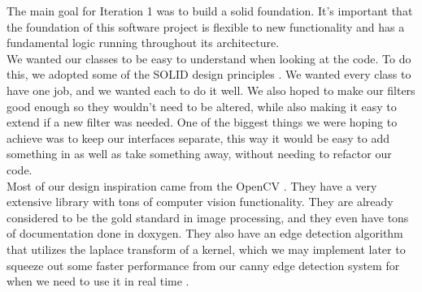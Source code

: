 The main goal for Iteration 1 was to build a solid foundation. It’s important that the foundation 
of this software project is flexible to new functionality and has a fundamental logic running 
throughout its architecture. \\

We wanted our classes to be easy to understand when looking at the code.  To do this, we adopted 
some of the SOLID design principles \cite{solid}.  We wanted every class to have one job, and we 
wanted each to do it well.  We also hoped to make our filters good enough so they wouldn’t need 
to be altered, while also making it easy to extend if a new filter was needed.  One of the 
biggest things we were hoping to achieve was to keep our interfaces separate, this way it would 
be easy to add something in as well as take something away, without needing to refactor our code. \\

Most of our design inspiration came from the OpenCV \cite{geek}.  They have a very extensive library 
with tons of computer vision functionality.  They are already considered to be the gold standard in 
image processing, and they even have tons of documentation done in doxygen.  They also have an 
edge detection algorithm that utilizes the laplace transform of a kernel, which we may implement 
later to squeeze out some faster performance from our canny edge detection system for when we need 
to use it in real time \cite{laplace}.